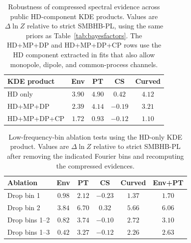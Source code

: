 \documentclass[symmetry,article,submit,pdftex,moreauthors]{Definitions/mdpi}
\begin{document}
\begin{table}[htbp]
    \centering
    \caption{Robustness of compressed spectral evidence across public HD-component KDE products. Values are $\Delta\ln Z$ relative to strict SMBHB-PL, using the same priors as Table~\ref{tab:bayesfactors}. The HD+MP+DP and HD+MP+DP+CP rows use the HD component extracted in fits that also allow monopole, dipole, and common-process channels.}
    \label{tab:kde-product-robustness}
    \small
    \begin{tabular}{lcccc}
        \toprule
        KDE product & Env & PT & CS & Curved \\
        \midrule
        HD only & $3.90$ & $4.90$ & $0.42$ & $4.12$ \\
        HD+MP+DP & $2.39$ & $4.14$ & $-0.19$ & $3.21$ \\
        HD+MP+DP+CP & $1.72$ & $0.93$ & $-0.12$ & $1.10$ \\
        \bottomrule
    \end{tabular}
\end{table}

\begin{table}[htbp]
    \centering
    \caption{Low-frequency-bin ablation tests using the HD-only KDE product. Values are $\Delta\ln Z$ relative to strict SMBHB-PL after removing the indicated Fourier bins and recomputing the compressed evidences.}
    \label{tab:low-bin-ablation}
    \small
    \begin{tabular}{lccccc}
        \toprule
        Ablation & Env & PT & CS & Curved & Env+PT \\
        \midrule
        Drop bin 1 & $0.98$ & $2.12$ & $-0.23$ & $1.37$ & $1.70$ \\
        Drop bin 2 & $3.84$ & $6.70$ & $0.32$ & $5.66$ & $6.06$ \\
        Drop bins 1--2 & $0.82$ & $3.74$ & $-0.10$ & $2.72$ & $3.10$ \\
        Drop bins 1--3 & $0.42$ & $3.27$ & $-0.12$ & $2.26$ & $2.63$ \\
        \bottomrule
    \end{tabular}
\end{table}
\end{document}
